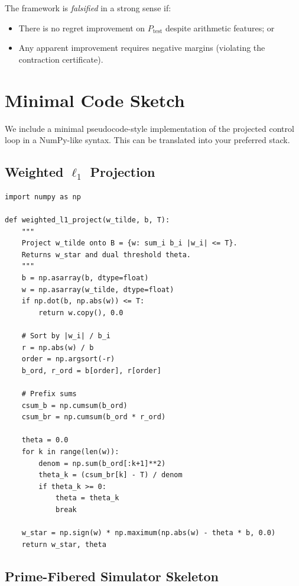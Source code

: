 \documentclass[11pt]{article}
\begin{document}
The framework is \emph{falsified} in a strong sense if:
\begin{itemize}
  \item There is no regret improvement on $P_{\text{test}}$ despite arithmetic features; or
  \item Any apparent improvement requires negative margins (violating the contraction certificate).
\end{itemize}

\section{Minimal Code Sketch}

We include a minimal pseudocode-style implementation of the projected control loop in a NumPy-like syntax. This can be translated into your preferred stack.

\subsection*{Weighted $\ell_1$ Projection}

\begin{verbatim}
import numpy as np

def weighted_l1_project(w_tilde, b, T):
    """
    Project w_tilde onto B = {w: sum_i b_i |w_i| <= T}.
    Returns w_star and dual threshold theta.
    """
    b = np.asarray(b, dtype=float)
    w = np.asarray(w_tilde, dtype=float)
    if np.dot(b, np.abs(w)) <= T:
        return w.copy(), 0.0

    # Sort by |w_i| / b_i
    r = np.abs(w) / b
    order = np.argsort(-r)
    b_ord, r_ord = b[order], r[order]

    # Prefix sums
    csum_b = np.cumsum(b_ord)
    csum_br = np.cumsum(b_ord * r_ord)

    theta = 0.0
    for k in range(len(w)):
        denom = np.sum(b_ord[:k+1]**2)
        theta_k = (csum_br[k] - T) / denom
        if theta_k >= 0:
            theta = theta_k
            break

    w_star = np.sign(w) * np.maximum(np.abs(w) - theta * b, 0.0)
    return w_star, theta
\end{verbatim}

\subsection*{Prime-Fibered Simulator Skeleton}
\end{document}
